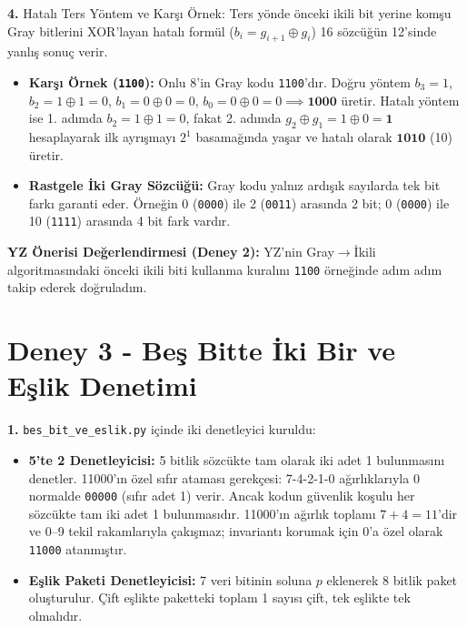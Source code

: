 \documentclass[10pt,a4paper]{article}
\begin{document}
\textbf{4.} Hatalı Ters Yöntem ve Karşı Örnek:
Ters yönde önceki ikili bit yerine komşu Gray bitlerini XOR'layan hatalı formül ($b_i = g_{i+1} \oplus g_i$) 16 sözcüğün 12'sinde yanlış sonuç verir.
\begin{itemize}
    \item \textbf{Karşı Örnek (\texttt{1100}):} Onlu 8'in Gray kodu \texttt{1100}'dır. Doğru yöntem $b_3=1$, $b_2 = 1\oplus 1 = 0$, $b_1 = 0\oplus 0 = 0$, $b_0 = 0\oplus 0 = 0 \implies \mathbf{1000}$ üretir. Hatalı yöntem ise 1. adımda $b_2 = 1\oplus 1 = 0$, fakat 2. adımda $g_2 \oplus g_1 = 1 \oplus 0 = \mathbf{1}$ hesaplayarak ilk ayrışmayı $2^1$ basamağında yaşar ve hatalı olarak $\mathbf{1010}$ (10) üretir.
    \item \textbf{Rastgele İki Gray Sözcüğü:} Gray kodu yalnız ardışık sayılarda tek bit farkı garanti eder. Örneğin 0 (\texttt{0000}) ile 2 (\texttt{0011}) arasında 2 bit; 0 (\texttt{0000}) ile 10 (\texttt{1111}) arasında 4 bit fark vardır.
\end{itemize}
\textbf{YZ Önerisi Değerlendirmesi (Deney 2):} YZ'nin Gray$\rightarrow$İkili algoritmasındaki önceki ikili biti kullanma kuralını \texttt{1100} örneğinde adım adım takip ederek doğruladım.

\newpage

\section*{Deney 3 - Beş Bitte İki Bir ve Eşlik Denetimi}

\textbf{1.} \texttt{bes\_bit\_ve\_eslik.py} içinde iki denetleyici kuruldu:
\begin{itemize}
    \item \textbf{5'te 2 Denetleyicisi:} 5 bitlik sözcükte tam olarak iki adet 1 bulunmasını denetler. 11000'ın özel sıfır ataması gerekçesi: 7-4-2-1-0 ağırlıklarıyla 0 normalde \texttt{00000} (sıfır adet 1) verir. Ancak kodun güvenlik koşulu her sözcükte tam iki adet 1 bulunmasıdır. 11000'ın ağırlık toplamı $7+4=11$'dir ve 0--9 tekil rakamlarıyla çakışmaz; invariantı korumak için 0'a özel olarak \texttt{11000} atanmıştır.
    \item \textbf{Eşlik Paketi Denetleyicisi:} 7 veri bitinin soluna $p$ eklenerek 8 bitlik paket oluşturulur. Çift eşlikte paketteki toplam 1 sayısı çift, tek eşlikte tek olmalıdır.
\end{itemize}
\end{document}

